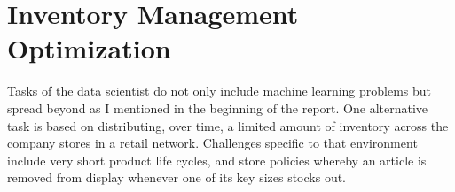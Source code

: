 \documentclass[11pt,fleqn]{book} %
\begin{document}






\chapter{Inventory Management Optimization}

Tasks of the data scientist do not only include machine learning problems but spread beyond as I mentioned in the beginning of the report. One alternative task is based on distributing, over time, a limited amount of inventory across the company stores in a retail network. Challenges specific to that environment include very short product life cycles, and store policies whereby an article is removed from display whenever one of its key sizes stocks out. 
\end{document}
